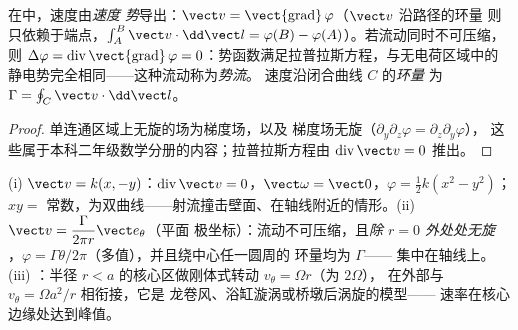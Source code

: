 \begin{definition}[速度势；环量]\label{def:b2:fluid-kinematics:potential}
在中，速度由\emph{速度
势}导出：$\vect v = \operatorname{\vect{grad}}\varphi$（$\vect v$ 沿路径的环量
则只依赖于端点，$\int_A^B\vect v
\cdot\dd\vect l = \varphi(B) - \varphi(A)$）。若流动同时不可压缩，
则 $\Delta\varphi = \operatorname{div}\operatorname{\vect{grad}}
\varphi = 0$：势函数满足拉普拉斯方程，与无电荷区域中的
静电势完全相同——这种流动称为\emph{势流}。
速度沿闭合曲线 $C$ 的\emph{环量}
为 $\Gamma = \oint_C\vect v\cdot\dd\vect l$。
\end{definition}

\begin{proof}
单连通区域上无旋的场为梯度场，以及
梯度场无旋（$\partial_y\partial_z\varphi = \partial_z\partial_y\varphi$），
这些属于本科二年级数学分册的内容；拉普拉斯方程由
$\operatorname{div}\vect v = 0$ 推出。
\end{proof}

\begin{example}[三种平面流动]\label{ex:b2:fluid-kinematics:planeflows}
(i) \emph{} $\vect v = k(x, -y)$：$\operatorname{div}\vect v =
0$，$\vect\omega = \vect 0$，$\varphi = \tfrac12k(x^2 - y^2)$；
$xy = $ 常数，为双曲线——射流撞击壁面、在轴线附近的情形。(ii)
\emph{} $\vect v = \dfrac{\Gamma}{2\pi r}\vect e_\theta$（平面
极坐标）：流动不可压缩，且\emph{除 $r = 0$ 外处处无旋}
，$\varphi = \Gamma\theta/2\pi$（多值），并且绕中心任一圆周的
环量均为 $\Gamma$——
集中在轴线上。(iii) \emph{}：半径
$r < a$ 的核心区做刚体式转动 $v_\theta = \Omega r$（为 $2\Omega$），
在外部与 $v_\theta = \Omega a^2/r$ 相衔接，它是
龙卷风、浴缸漩涡或桥墩后涡旋的模型——
速率在核心边缘处达到峰值。
\end{example}

